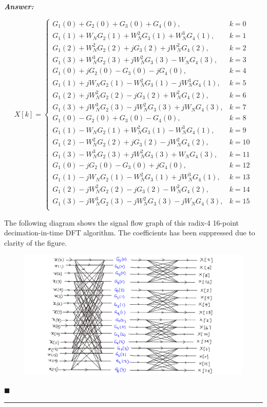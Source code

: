 \documentclass[12pt]{article}
\theoremstyle{definition}
\newenvironment{answer}{
    \textbf{\textit{Answer:}} \qquad
}{\hfill $\blacksquare$ \\ \begin{center}
    \rule{0.6\linewidth}{0.5px}    
\end{center}
}
\begin{document}
\begin{answer}
    $$
    X[k] = \begin{cases}
        G_1(0) + G_2(0) + G_3(0) + G_4(0), & k = 0\\
        G_1(1) + W_N G_2(1) + W_N^2 G_3(1) + W_N^{3} G_4(1), & k = 1\\
        G_1(2) + W_N^2 G_2(2) + j G_3(2) + j W_N^{2} G_4(2), & k = 2\\
        G_1(3) + W_N^3 G_2(3) + j W_N^{2} G_3(3) - W_N G_4(3), & k = 3\\
        G_1(0) + j G_2(0) - G_3(0) - j G_4(0), & k = 4\\
        G_1(1) + j W_N G_2(1) - W_N^{2} G_3(1) - j W_N^{3} G_4(1), & k = 5\\
        G_1(2) + j W_N^2 G_2(2) - j G_3(2) + W_N^{2} G_4(2), & k = 6\\
        G_1(3) + j W_N^3 G_2(3) - j W_N^{2} G_3(3) +  j W_N G_4(3), & k = 7\\
        G_1(0) - G_2(0) + G_3(0) - G_4(0), & k = 8\\
        G_1(1) - W_N G_2(1) + W_N^2 G_3(1) - W_N^{3} G_4(1), & k = 9\\
        G_1(2) - W_N^2 G_2(2) + j G_3(2) - j W_N^{2} G_4(2), & k = 10\\
        G_1(3) - W_N^3 G_2(3) + j W_N^{2} G_3(3) +  W_N G_4(3), & k = 11\\
        G_1(0) - j G_2(0) - G_3(0) + j G_4(0), & k = 12\\
        G_1(1) - j W_N G_2(1) - W_N^{2} G_3(1) + j W_N^{3} G_4(1), & k = 13\\
        G_1(2) - j W_N^2 G_2(2) - j G_3(2) - W_N^{2} G_4(2), & k = 14\\
        G_1(3) - j W_N^3 G_2(3) - j W_N^{2} G_3(3) - j W_N G_4(3), & k = 15\\
    \end{cases} 
    $$

    The following diagram shows the signal flow graph of this radix-4 16-point decimation-in-time DFT algorithm. The coefficients has been suppressed due to clarity of the figure.

    \begin{figure}[H]
        \includegraphics[width = \linewidth]{fft-radix4.png}
    \end{figure}

\end{answer}
\end{document}
